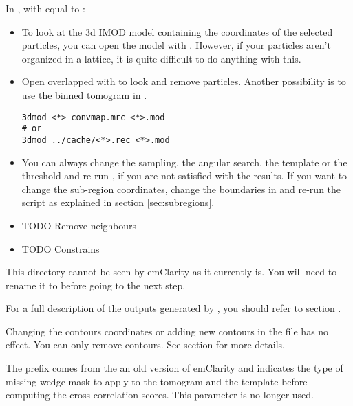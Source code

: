 In , with  equal to :
\begin{itemize}
    \item To look at the 3d IMOD model containing the coordinates of the selected particles, you can open the model with . However, if your particles aren't organized in a lattice, it is quite difficult to do anything with this.
    \item Open  overlapped with  to look and remove particles. Another possibility is to use the binned tomogram in .
\begin{lstlisting}
3dmod <*>_convmap.mrc <*>.mod
# or
3dmod ../cache/<*>.rec <*>.mod
\end{lstlisting}
    \item You can always change the sampling, the angular search, the template or the threshold and re-run , if you are not satisfied with the results. If you want to change the sub-region coordinates, change the boundaries in  and re-run the  script as explained in section \ref{sec:subregions}.
    \item TODO Remove neighbours
    \item TODO Constrains
\end{itemize}

This directory cannot be seen by emClarity as it currently is. You will need to rename it to  before going to the next step.

\begin{note}For a full description of the outputs generated by , you should refer to section .
\end{note}

\begin{note}Changing the contours coordinates or adding new contours in the  file has no effect. You can only remove contours. See section  for more details.
\end{note}

\begin{note}The  prefix comes from the an old version of emClarity and indicates the type of missing wedge mask to apply to the tomogram and the template before computing the cross-correlation scores. This parameter is no longer used.
\end{note}

